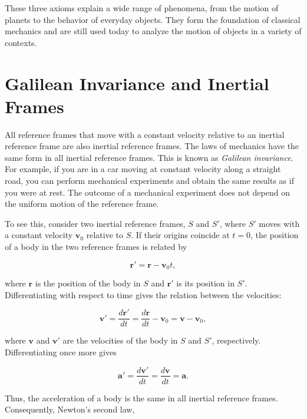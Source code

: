\documentclass[../main.tex]{subfiles}
\begin{document}
These three axioms explain a wide range of phenomena, from the motion of planets to the behavior of everyday objects. They form the foundation of classical mechanics and are still used today to analyze the motion of objects in a variety of contexts.

\section{Galilean Invariance and Inertial Frames}

All reference frames that move with a constant velocity relative to an inertial reference frame are also inertial reference frames. The laws of  mechanics have the same form in all inertial reference frames. This is known as \emph{Galilean invariance}. For example, if you are in a car moving at constant velocity along a straight road, you can perform mechanical experiments and obtain the same results as if you were at rest. The outcome of a mechanical experiment does not depend on the uniform motion of the reference frame.

To see this, consider two inertial reference frames, $S$ and $S'$, where $S'$ moves with a constant velocity $\mathbf{v}_0$ relative to $S$. If their origins coincide at $t=0$, the position of a body in the two reference frames is related by

\begin{equation}
\mathbf{r}' = \mathbf{r} - \mathbf{v}_0 t,
\end{equation}

where $\mathbf{r}$ is the position of the body in $S$ and $\mathbf{r}'$ is its position in $S'$. Differentiating with respect to time gives the relation between the velocities:

\begin{equation}
\mathbf{v}' = \frac{d\mathbf{r}'}{dt}
= \frac{d\mathbf{r}}{dt} - \mathbf{v}_0
= \mathbf{v} - \mathbf{v}_0,
\end{equation}

where $\mathbf{v}$ and $\mathbf{v}'$ are the velocities of the body in $S$ and $S'$, respectively. Differentiating once more gives

\begin{equation}
\mathbf{a}' = \frac{d\mathbf{v}'}{dt}
= \frac{d\mathbf{v}}{dt}
= \mathbf{a}.
\end{equation}

Thus, the acceleration of a body is the same in all inertial reference frames. Consequently, Newton's second law,
\end{document}
